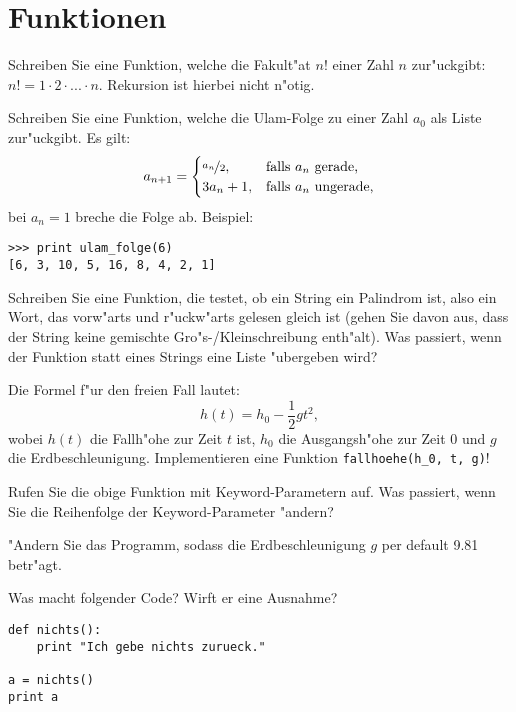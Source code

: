 \section*{Funktionen}
\begin{aufgabe}[Fakult"at]
\label{fakultaet}
Schreiben Sie eine Funktion, welche die Fakult"at $n!$ einer Zahl $n$ zur"uckgibt: $n! = 1 \cdot 2 \cdot ... \cdot n$. Rekursion ist hierbei nicht n"otig.
\end{aufgabe}

\begin{aufgabe}
\label{ulamfolge}
Schreiben Sie eine Funktion, welche die Ulam-Folge zu einer Zahl $a_0$ als Liste zur"uckgibt. Es gilt: 
\begin{displaymath}
a_{n+1} =
\begin{cases}
\nicefrac{a_n}{2}, & \text{falls } a_n \text{ gerade,}\\
3 a_n+1, & \text{falls } a_n \text{ ungerade,}\\
\end{cases}
\end{displaymath}
 bei $a_n=1$ breche die Folge ab. 
Beispiel: 
\begin{lstlisting}
>>> print ulam_folge(6)
[6, 3, 10, 5, 16, 8, 4, 2, 1]
\end{lstlisting}
\end{aufgabe}

\begin{aufgabe}[Palindrom]
\label{palindrom}
Schreiben Sie eine Funktion, die testet, ob ein String ein Palindrom ist, also ein Wort, das vorw"arts und r"uckw"arts gelesen gleich ist (gehen Sie davon aus, dass der String keine gemischte Gro"s-/Kleinschreibung enth"alt). Was passiert, wenn der Funktion statt eines Strings eine Liste "ubergeben wird? 
\end{aufgabe}

\begin{aufgabe}
\label{freier_fall}
Die Formel f"ur den freien Fall lautet: 
\begin{displaymath}
h(t) = h_0 - \frac{1}{2} gt^2, 
\end{displaymath}
wobei $h(t)$ die Fallh"ohe zur Zeit $t$ ist, $h_0$ die Ausgangsh"ohe zur Zeit 0 und $g$ die Erdbeschleunigung. Implementieren eine Funktion \lstinline{fallhoehe(h_0, t, g)}!
\begin{teilaufgabe}
Rufen Sie die obige Funktion mit Keyword-Parametern auf. Was passiert, wenn Sie die Reihenfolge der Keyword-Parameter "andern?
\end{teilaufgabe}
\begin{teilaufgabe}
"Andern Sie das Programm, sodass die Erdbeschleunigung $g$ per default 9.81 betr"agt.
\end{teilaufgabe}
\end{aufgabe}

\begin{aufgabe}
Was macht folgender Code? Wirft er eine Ausnahme?
\begin{lstlisting}
def nichts():
    print "Ich gebe nichts zurueck."

a = nichts()
print a
\end{lstlisting}
\end{aufgabe}


